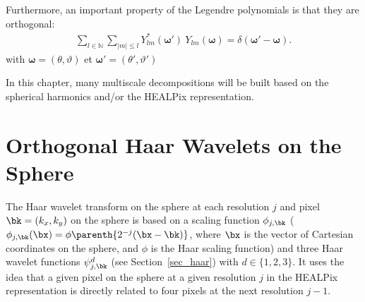 Furthermore, an important property of the Legendre polynomials is that they are orthogonal:  
\begin{eqnarray}
\label{ortho_harm_sph}
\sum_{l\in\mathbb{N}} \sum_{|m|\leqslant l} Y^*_{lm}({\boldsymbol \omega}') \ Y_{lm}({\boldsymbol \omega}) = \delta({\boldsymbol \omega}' - {\boldsymbol \omega}) .
\end{eqnarray}
with ${\boldsymbol \omega} = (\theta,\vartheta)$ et ${\boldsymbol \omega}' = (\theta',\vartheta')$




In this chapter, many multiscale decompositions will be built 
based on the spherical harmonics and/or the HEALPix representation.

\section{Orthogonal Haar Wavelets on the Sphere}
\label{mrs_haar}

The Haar wavelet transform on the sphere  \citep{wave:sweldens95a} 
at each resolution $j$ and pixel $\bk=(k_x,k_y)$ on the sphere is based on a scaling function  $\phi_{j,\bk}$ ($\phi_{j,\bk}(\bx) = \phi\parenth{2^{-j}(\bx-\bk)}$, where $\bx$ is the vector of Cartesian coordinates on the sphere, and $\phi$ is the Haar scaling function) 
and three Haar wavelet functions $\psi^{d}_{j,\bk}$ (see Section~\ref{sec_haar})
with  $d \in\{1,2,3\}$. It uses the idea that a given pixel on the sphere at a given resolution $j$  in the HEALPix representation
is directly related to four pixels at the next resolution $j-1$.  

